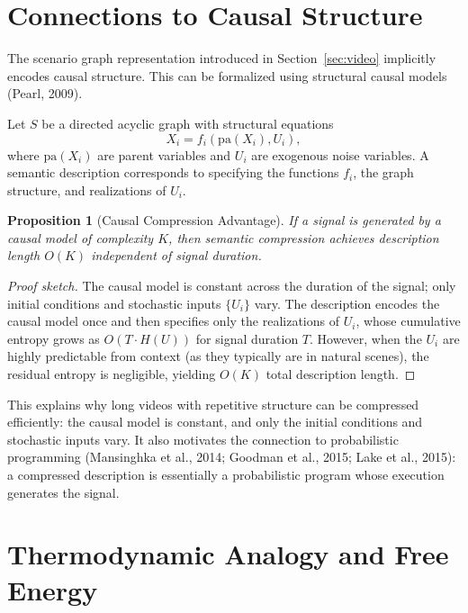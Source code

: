 \documentclass[11pt,a4paper]{article}
\newtheorem{proposition}[theorem]{Proposition}
\theoremstyle{definition}
\theoremstyle{remark}
\begin{document}
\section{Connections to Causal Structure}
\label{sec:causal}

The scenario graph representation introduced in Section~\ref{sec:video} implicitly encodes causal structure. This can be formalized using structural causal models (Pearl, 2009).

Let $S$ be a directed acyclic graph with structural equations
\[
X_i = f_i(\mathrm{pa}(X_i), U_i),
\]
where $\mathrm{pa}(X_i)$ are parent variables and $U_i$ are exogenous noise variables. A semantic description corresponds to specifying the functions $f_i$, the graph structure, and realizations of $U_i$.

\begin{proposition}[Causal Compression Advantage]
If a signal is generated by a causal model of complexity $K$, then semantic compression achieves description length $O(K)$ independent of signal duration.
\end{proposition}

\begin{proof}[Proof sketch]
The causal model is constant across the duration of the signal; only initial conditions and stochastic inputs $\{U_i\}$ vary. The description encodes the causal model once and then specifies only the realizations of $U_i$, whose cumulative entropy grows as $O(T \cdot H(U))$ for signal duration $T$. However, when the $U_i$ are highly predictable from context (as they typically are in natural scenes), the residual entropy is negligible, yielding $O(K)$ total description length.
\end{proof}

This explains why long videos with repetitive structure can be compressed efficiently: the causal model is constant, and only the initial conditions and stochastic inputs vary. It also motivates the connection to probabilistic programming (Mansinghka et al., 2014; Goodman et al., 2015; Lake et al., 2015): a compressed description is essentially a probabilistic program whose execution generates the signal.

\section{Thermodynamic Analogy and Free Energy}
\label{sec:thermodynamics}
\end{document}
